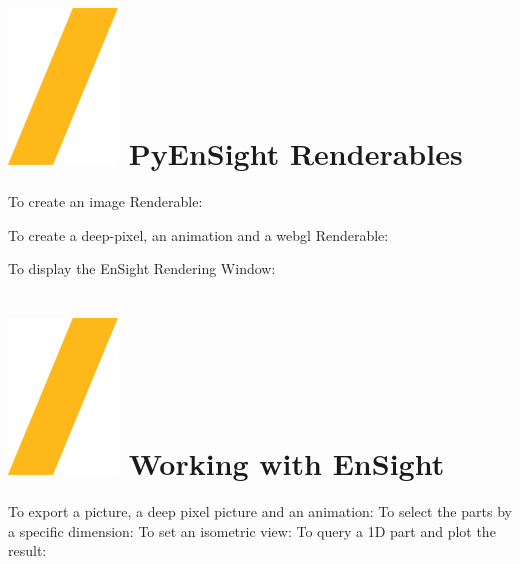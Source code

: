 \documentclass[9pt,landscape]{article}
\begin{document}
\begin{multicols}{3}


\section{\includegraphics[height=\fontcharht\font`\S]{slash.png} PyEnSight Renderables}

To create an image Renderable:



To create a deep-pixel, an animation and a webgl Renderable:

To display the EnSight Rendering Window:


\section{{\includegraphics[height=\fontcharht\font`\S]{slash.png}  Working with EnSight}}

To export a picture, a deep pixel picture and an animation:
To select the parts by a specific dimension:
To set an isometric view: 
To query a 1D part and plot the result:



\end{multicols}
\end{document}

